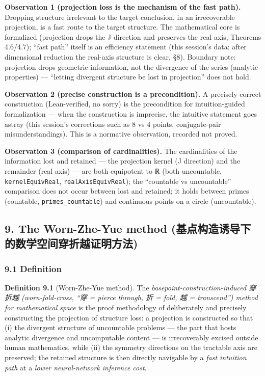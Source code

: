 \documentclass[
]{article}
\begin{document}
\textbf{Observation 1 (projection loss is the mechanism of the fast
path).} Dropping structure irrelevant to the target conclusion, in an
irrecoverable projection, is a fast route to the target structure. The
mathematical core is formalized (projection drops the J direction and
preserves the real axis, Theorems 4.6/4.7); ``fast path'' itself is an
efficiency statement (this session's data: after dimensional reduction
the real-axis structure is clear, §8). Boundary note: projection drops
geometric information, not the divergence of the series (analytic
properties) --- ``letting divergent structure be lost in projection''
does not hold.

\textbf{Observation 2 (precise construction is a precondition).} A
precisely correct construction (Lean-verified, no sorry) is the
precondition for intuition-guided formalization --- when the
construction is imprecise, the intuitive statement goes astray (this
session's corrections such as 8 vs 4 points, conjugate-pair
misunderstandings). This is a normative observation, recorded not
proved.

\textbf{Observation 3 (comparison of cardinalities).} The cardinalities
of the information lost and retained --- the projection kernel (J
direction) and the remainder (real axis) --- are both equipotent to ℝ
(both uncountable, \texttt{kernelEquivReal},
\texttt{realAxisEquivReal}); the ``countable vs uncountable'' comparison
does not occur between lost and retained; it holds between primes
(countable, \texttt{primes\_countable}) and continuous points on a
circle (uncountable).

\subsection{9. The Worn-Zhe-Yue method
(基点构造诱导下的数学空间穿折越证明方法)}\label{the-worn-zhe-yue-method-ux57faux70b9ux6784ux9020ux8bf1ux5bfcux4e0bux7684ux6570ux5b66ux7a7aux95f4ux7a7fux6298ux8d8aux8bc1ux660eux65b9ux6cd5}

\subsubsection{9.1 Definition}\label{definition}

\textbf{Definition 9.1} (Worn-Zhe-Yue method). The
\emph{basepoint-construction-induced 穿折越 (worn-fold-cross, ``穿 =
pierce through, 折 = fold, 越 = transcend'') method for mathematical
space} is the proof methodology of deliberately and precisely
constructing the projection of structure loss: a projection is
constructed so that (i) the divergent structure of uncountable problems
--- the part that hosts analytic divergence and uncomputable content ---
is irrecoverably excised outside human mathematics, while (ii) the
symmetry directions on the tractable axis are preserved; the retained
structure is then directly navigable by a \emph{fast intuition path} at
a \emph{lower neural-network inference cost}.
\end{document}
